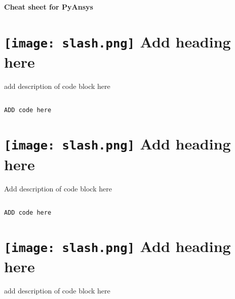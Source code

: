 \documentclass[9pt,landscape]{article}
\begin{document}
\raggedright
\footnotesize


\begin{center}
     \Huge{\textbf{Cheat sheet for PyAnsys}} \\
\end{center}
\vspace{-0.15cm}
\noindent\makebox[\linewidth]{\rule{\paperwidth}{2pt}}

\begin{multicols}{3}
\setlength{\premulticols}{1pt}
\setlength{\postmulticols}{1pt}
\setlength{\multicolsep}{1pt}
\setlength{\columnsep}{2pt}


\section{\texttt{[image: slash.png]} Add heading here}
add description of code block here
\begin{lstlisting}[language=Python]

ADD code here

\end{lstlisting}


\vfill
\section{\texttt{[image: slash.png]}  Add heading here}
Add description of code block here
\begin{lstlisting}[language=Python]

ADD code here

\end{lstlisting} 

\vfill
\section{\texttt{[image: slash.png]}  Add heading here}
add description of code block here
\begin{lstlisting}[language=Python]


\end{lstlisting}
\end{multicols}
\end{document}
